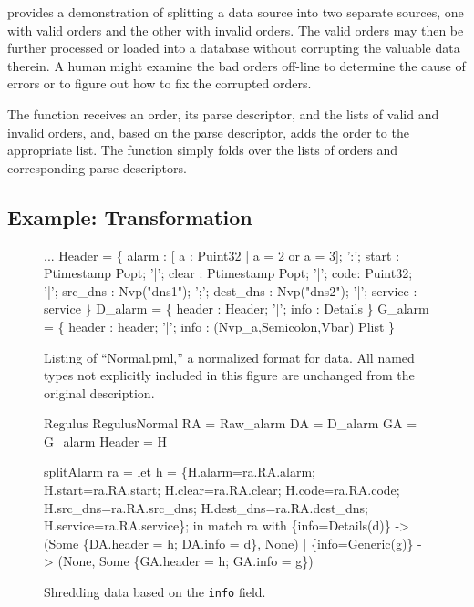  provides a demonstration of
splitting a \dibbler{} data source into two separate sources, one with
valid orders and the other with invalid orders.  The valid
orders may then be further processed or loaded into a database
without corrupting the valuable data therein.  A human might examine
the bad orders off-line to determine the cause of errors or to figure
out how to fix the corrupted orders.

The  function receives an order, its parse descriptor,
and the lists of valid and invalid orders, and, based on the parse
descriptor, adds the order to the appropriate list.  The function
 simply folds  over the lists of
orders and corresponding parse descriptors.

\subsection{Example: Transformation}
\label{sec:ex-trans}

\begin{figure}
  \centering
  \begin{code}\scriptsize
...
 Header = \{
       alarm : [ a : Puint32 | a = 2 or a = 3];
 ':';  start :  Ptimestamp Popt;
 '|';  clear :  Ptimestamp Popt;
 '|';  code: Puint32;
 '|';  src\_dns  :  Nvp("dns1");
 ';';  dest\_dns :  Nvp("dns2");
 '|';  service  : service
\}
\mbox{}
 D\_alarm = \{
       header : Header;
 '|';  info   : Details
 \}
\mbox{}
 G\_alarm = \{
       header : header;
 '|';  info   : (Nvp\_a,Semicolon,Vbar) Plist
\}\end{code}
\caption{Listing of ``\darkstar{}Normal.pml,'' a normalized format for
  \darkstar{} data. All named types not explicitly included in this
  figure are unchanged from the original \darkstar{} description.}
\label{fig:normal-darkstar}
\end{figure}

\begin{figure}
\begin{code}\scriptsize
{} Regulus
 RegulusNormal
 RA = Raw\_alarm
 DA = D\_alarm
 GA = G\_alarm
 Header = H

 splitAlarm ra =
    let h = 
       \{H.alarm=ra.RA.alarm; H.start=ra.RA.start; 
         H.clear=ra.RA.clear; H.code=ra.RA.code;
         H.src\_dns=ra.RA.src\_dns; H.dest\_dns=ra.RA.dest\_dns;
         H.service=ra.RA.service\};
    in match ra with
        \{info=Details(d)\} -> 
        (Some \{DA.header = h; DA.info = d\}, None)
      | \{info=Generic(g)\} ->
        (None, Some \{GA.header = h; GA.info = g\})    
  \end{code}
  \caption{Shredding \darkstar{} data based on the {\tt info} field.}
  \label{fig:ex-no-err-check}
\end{figure}

